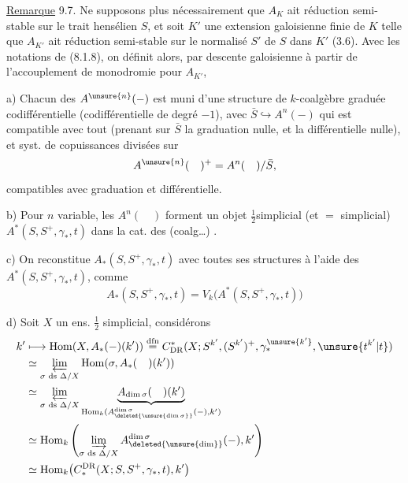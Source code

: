 \uline{Remarque} 9.7. Ne supposons plus nécessairement que $A_K$ ait réduction semi-stable sur le trait hensélien $S$, et soit $K'$ une extension galoisienne finie de $K$ telle que $A_{K'}$ ait réduction semi-stable sur le normalisé $S'$ de $S$ dans $K'$ (3.6). Avec les notations de (8.1.8), on définit alors, par descente galoisienne à partir de l'accouplement de monodromie pour $A_{K'}$,


a) Chacun des $A^{\unsure{n}}(-)$ est muni d'une structure de $k$-coalgèbre  graduée codifférentielle (codifférentielle de degré $-1$), avec  $\bar S\hookrightarrow A^n(-)$ qui est compatible avec tout (prenant sur $\bar S$ la graduation nulle, et la différentielle nulle), et  syst. de copuissances divisées sur
\[
 A^{\unsure{n}}(\quad)^+=A^n(\quad)/\bar S,
\]
compatibles avec graduation et différentielle.

b) Pour $n$ variable, les $A^n(\quad)$ forment un objet $\frac12$simplicial (et $=$ simplicial) $A^*(S,S^+,\gamma_*,t)$ dans la cat. des  (coalg\ldots) .

c) On reconstitue $A_*(S,S^+,\gamma_*,t)$  avec toutes ses structures à l'aide des $A^*(S,S^+,\gamma_*,t)$, comme
\[
 A_*(S,S^+,\gamma_*,t)=V_k\bigl(A^*(S,S^+,\gamma_*,t)\bigr)
\]

d) Soit $X$ un ens. $\frac12$ simplicial, considérons
\[
\begin{aligned}
 k'&\longmapsto\operatorname{Hom}(X,A_*(-)(k'))
 \overset{\mathrm{dfn}}=C^*_{\mathrm{DR}}(X;S^{k'},(S^{k'})^+,\gamma_*^{\unsure{k'}},\unsure{t^{k'}|t})\\
 &\simeq\varprojlim_{\sigma\text{ ds }\Delta/X}\operatorname{Hom}(\sigma,A_*(\quad)(k'))\\
 &\simeq\varprojlim_{\sigma\text{ ds }\Delta/X}\underbrace{A_{\dim\sigma}(\quad)(k')}_{\operatorname{Hom}_k(A^{\dim\sigma}_{\deleted{\unsure{\dim\sigma}}}(-),k')}\\
 &\simeq\operatorname{Hom}_k\left(\varinjlim_{\sigma\text{ ds }\Delta/X} A^{\dim\sigma}_{\deleted{\unsure{\dim}}}(-),k'\right)\\
 &\simeq\operatorname{Hom}_k\bigl(C_*^{\mathrm{DR}}(X;S,S^+,\gamma_*,t),k'\bigr)
\end{aligned}
\]

